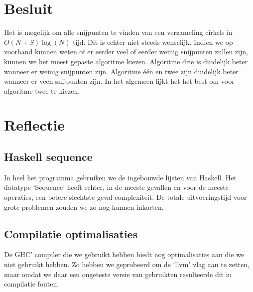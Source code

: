 \newpage
\section{Besluit}
Het is mogelijk om alle snijpunten te vinden van een verzameling cirkels in $O(N+S)\log(N)$ tijd. Dit is echter niet steeds  wenselijk. Indien we op voorhand kunnen weten of er eerder veel of eerder weinig snijpunten zullen zijn, kunnen we het meest gepaste algoritme kiezen.
Algoritme drie is duidelijk beter wanneer er weinig snijpunten zijn. Algoritme \'e\'en en twee zijn duidelijk beter wanneer er veen snijpunten zijn.
In het algemeen lijkt het het best om voor algoritme twee te kiezen.


\section{Reflectie}

\subsection{Haskell sequence}
In heel het programma gebruiken we de ingebouwde lijsten van Haskell. Het datatype `Sequence' heeft echter, in de meeste gevallen en voor de meeste operaties, een betere slechtste geval-complexiteit. De totale uitvoeringstijd voor grote problemen zouden we zo nog kunnen inkorten.

\subsection{Compilatie optimalisaties}
De GHC' compiler die we gebruikt hebben biedt nog optimalisaties aan die we niet gebruikt hebben. Zo hebben we geprobeerd om de `llvm' vlag aan te zetten, maar omdat we daar een ongeteste versie van gebruikten resulteerde dit in compilatie fouten.